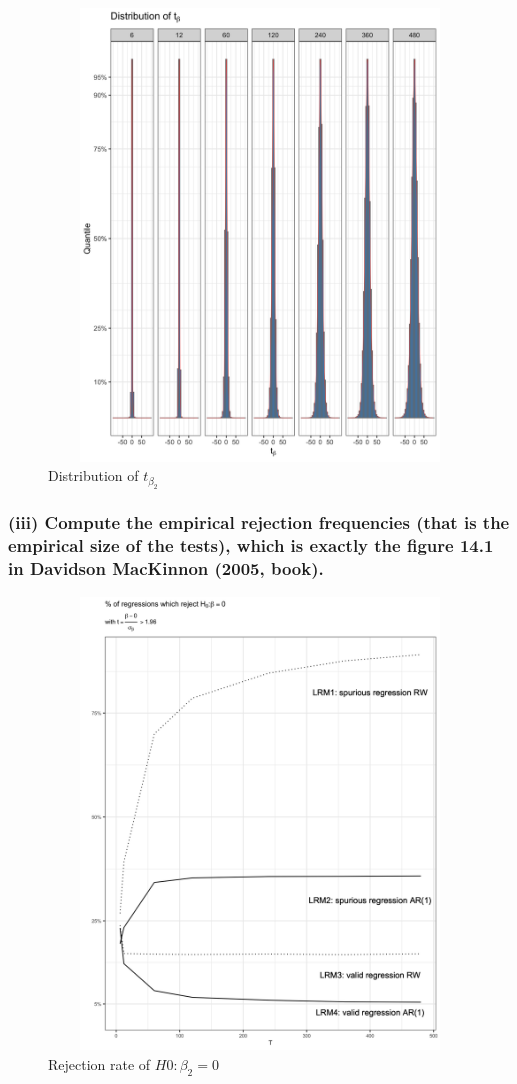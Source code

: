 \documentclass[]{article}
\begin{document}
\begin{figure}[H]
	\centering
	\includegraphics[width=14cm, height=12cm]{"./1aii_chart"}
	\caption[]{Distribution of $t_{\beta_2}$}
\end{figure}

\newpage
\subsubsection*{(iii) Compute the empirical rejection frequencies (that is the empirical size of the tests), which is exactly the figure 14.1 in Davidson MacKinnon (2005, book).}

\begin{figure}[H]
	\centering
	\includegraphics[width=14cm, height=12cm]{"./1aiii_chart"}
	\caption[]{Rejection rate of $H0: \beta_2=0$}
\end{figure}
\end{document}
